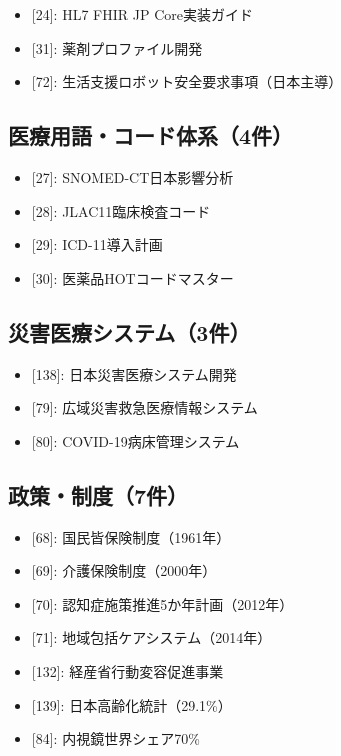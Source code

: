 \documentclass[
  a4paper,
  a4paper,
  11pt]{ltjsbook}
\providecommand{\tightlist}{%
  \setlength{\itemsep}{0pt}\setlength{\parskip}{0pt}}
\begin{document}
\begin{itemize}
\tightlist
\item
  {[}24{]}: HL7 FHIR JP Core実装ガイド
\item
  {[}31{]}: 薬剤プロファイル開発
\item
  {[}72{]}: 生活支援ロボット安全要求事項（日本主導）
\end{itemize}

\subsection{医療用語・コード体系（4件）}\label{ux533bux7642ux7528ux8a9eux30b3ux30fcux30c9ux4f53ux7cfb4ux4ef6}

\begin{itemize}
\tightlist
\item
  {[}27{]}: SNOMED-CT日本影響分析
\item
  {[}28{]}: JLAC11臨床検査コード
\item
  {[}29{]}: ICD-11導入計画
\item
  {[}30{]}: 医薬品HOTコードマスター
\end{itemize}

\subsection{災害医療システム（3件）}\label{ux707dux5bb3ux533bux7642ux30b7ux30b9ux30c6ux30e03ux4ef6}

\begin{itemize}
\tightlist
\item
  {[}138{]}: 日本災害医療システム開発
\item
  {[}79{]}: 広域災害救急医療情報システム
\item
  {[}80{]}: COVID-19病床管理システム
\end{itemize}

\subsection{政策・制度（7件）}\label{ux653fux7b56ux5236ux5ea67ux4ef6}

\begin{itemize}
\tightlist
\item
  {[}68{]}: 国民皆保険制度（1961年）
\item
  {[}69{]}: 介護保険制度（2000年）\\
\item
  {[}70{]}: 認知症施策推進5か年計画（2012年）
\item
  {[}71{]}: 地域包括ケアシステム（2014年）
\item
  {[}132{]}: 経産省行動変容促進事業
\item
  {[}139{]}: 日本高齢化統計（29.1\%）
\item
  {[}84{]}: 内視鏡世界シェア70\%
\end{itemize}
\end{document}
